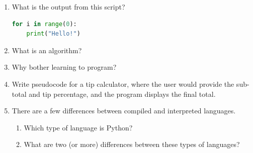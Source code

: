\documentclass[letter,10pt]{article}
\begin{document}
\begin{enumerate}
    \item What is the output from this script?
    \begin{lstlisting}[language=python]
for i in range(0):
    print("Hello!")
    \end{lstlisting}
    
    \item What is an algorithm?
    
    \item Why bother learning to program?
    
    \item Write pseudocode for a tip calculator, where the user would provide the sub-total and tip percentage, and the program displays the final total.
    
    \item There are a few differences between compiled and interpreted languages.
    \begin{enumerate}
    	\item Which type of language is Python?
		\item What are two (or more) differences between these types of languages?
    \end{enumerate}
\end{enumerate}
\end{document}

